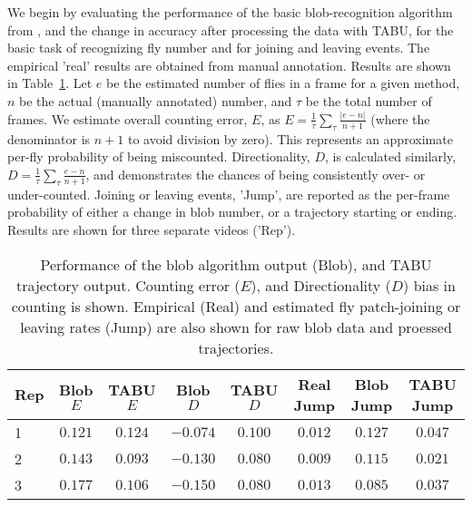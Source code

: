 \documentclass[11pt]{article}
\begin{document}
{\vspace*{-0.15in}
We begin by evaluating the performance of the basic blob-recognition algorithm from \cite{ArdekaniTavare:2013}, and the change in accuracy after processing the data with TABU, for the basic task of recognizing fly number and for joining and leaving events. The  empirical 'real' results are obtained from manual annotation. Results are shown in Table~\ref{BlobTabu}. Let $e$ be the estimated number of flies in a frame for a given method, $n$ be the actual (manually annotated) number, and $\tau$ be the total number of frames. We estimate overall counting error, $E$, as $E=\frac{1}{\tau}\sum \limits_\tau \frac{|e-n|}{n+1}$ (where the denominator is $n+1$ to avoid division by zero). This represents an approximate per-fly probability of being miscounted.  Directionality, $D$, is calculated similarly, $D=\frac{1}{\tau}\sum \limits_\tau \frac{e-n}{n+1}$, and demonstrates the chances of being consistently over- or under-counted. Joining or leaving events, 'Jump', are reported as the per-frame probability of either a change in blob number, or a trajectory starting or ending. Results are shown for three separate videos ('Rep').

\begin{table}[ht]
\vspace*{-0.15in}
\centering
\caption{Performance of the blob algorithm output (Blob), and TABU trajectory output. Counting error ($E$), and Directionality ($D$) bias in counting is shown. Empirical (Real) and estimated fly patch-joining or leaving rates (Jump) are also shown for raw blob data and proessed trajectories.} 
\label{BlobTabu}
\vspace{0.05in}
\begin{tabular}{lccccccc}
	\hline
	Rep & Blob $E$ & TABU $E$ & Blob $D$ & TABU $D$ & Real Jump& Blob Jump & TABU Jump \\
	\hline
	1 & $0.121$ & $0.124$   & $-0.074$      & $0.100$      & $0.012$    &   $0.127$   & $0.047$ \\
	2 & $0.143$ & $0.093$   & $-0.130$      & $0.080$      & $0.009$    & $0.115$ & $0.021$ \\
	3 & $0.177$ & $0.106$   & $-0.150$     & $0.080$      & $0.013$    & $0.085$ & $0.037$ \\
	
	\hline
\end{tabular}
\end{table}

}
\end{document}
